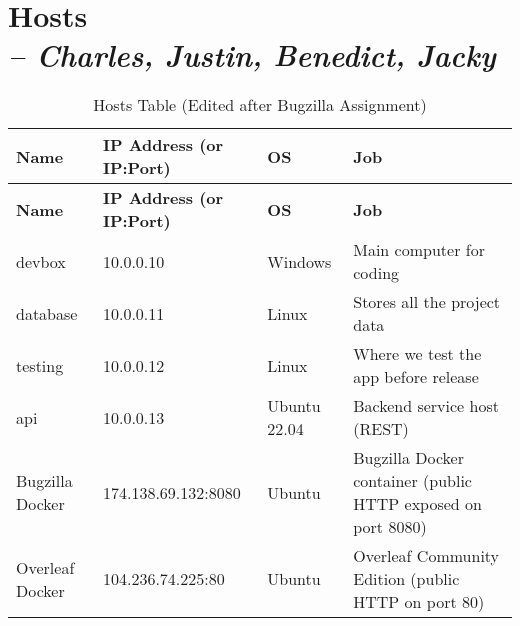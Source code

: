 \chapter[Hosts]{Hosts\\\small{\textit{-- Charles, Justin, Benedict, Jacky}}}
\label{Chapter::Hosts}

\begin{longtable}{|p{2.5cm}||p{5cm}||p{2.5cm}||p{6.5cm}|}
\caption{Hosts Table (Edited after Bugzilla Assignment)\label{Table::HostsTable}}\\
\hline
\textbf{Name} & \textbf{IP Address (or IP:Port)} & \textbf{OS} & \textbf{Job} \\
\hline
\endfirsthead
\hline
\textbf{Name} & \textbf{IP Address (or IP:Port)} & \textbf{OS} & \textbf{Job} \\
\hline
\endhead

devbox & 10.0.0.10 & Windows & Main computer for coding \\
\hline

database & 10.0.0.11 & Linux & Stores all the project data \\
\hline

testing & 10.0.0.12 & Linux & Where we test the app before release \\
\hline

api & 10.0.0.13 & Ubuntu 22.04 & Backend service host (REST) \\
\hline

Bugzilla Docker & 174.138.69.132:8080 & Ubuntu & Bugzilla Docker container (public HTTP exposed on port 8080) \\
\hline

Overleaf Docker & 104.236.74.225:80 & Ubuntu & Overleaf Community Edition (public HTTP on port 80) \\
\hline

\end{longtable}
